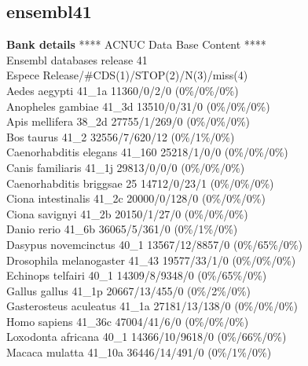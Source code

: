 \documentclass{article}
\begin{document}
\begin{Schunk}
\section{ ensembl41 }
\textbf{Bank details}
            ****     ACNUC Data Base Content      ****   \\
                 Ensembl databases release 41        \\
Espece                                  Release/\#CDS(1)/STOP(2)/N(3)/miss(4)\\
Aedes aegypti                           41\_1a 11360/0/2/0 (0\%/0\%/0\%)\\
Anopheles gambiae                       41\_3d 13510/0/31/0 (0\%/0\%/0\%)\\
Apis mellifera                          38\_2d 27755/1/269/0 (0\%/0\%/0\%)\\
Bos taurus                              41\_2 32556/7/620/12 (0\%/1\%/0\%)\\
Caenorhabditis elegans                  41\_160 25218/1/0/0 (0\%/0\%/0\%)\\
Canis familiaris                        41\_1j 29813/0/0/0 (0\%/0\%/0\%)\\
Caenorhabditis briggsae                 25 14712/0/23/1 (0\%/0\%/0\%)\\
Ciona intestinalis                      41\_2c 20000/0/128/0 (0\%/0\%/0\%)\\
Ciona savignyi                          41\_2b 20150/1/27/0 (0\%/0\%/0\%)\\
Danio rerio                             41\_6b 36065/5/361/0 (0\%/1\%/0\%)\\
Dasypus novemcinctus                    40\_1 13567/12/8857/0 (0\%/65\%/0\%)\\
Drosophila melanogaster                 41\_43 19577/33/1/0 (0\%/0\%/0\%)\\
Echinops telfairi                       40\_1 14309/8/9348/0 (0\%/65\%/0\%)\\
Gallus gallus                           41\_1p 20667/13/455/0 (0\%/2\%/0\%)\\
Gasterosteus aculeatus                  41\_1a 27181/13/138/0 (0\%/0\%/0\%)\\
Homo sapiens                            41\_36c 47004/41/6/0 (0\%/0\%/0\%)\\
Loxodonta africana                      40\_1 14366/10/9618/0 (0\%/66\%/0\%)\\
Macaca mulatta                          41\_10a 36446/14/491/0 (0\%/1\%/0\%)\\

\end{Schunk}
\end{document}
